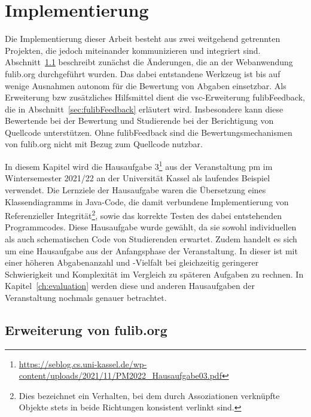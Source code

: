 \chapter{Implementierung}\label{ch:implementation}

Die Implementierung dieser Arbeit besteht aus zwei weitgehend getrennten Projekten, die jedoch miteinander kommunizieren und integriert sind.
Abschnitt~\ref{sec:expanding-fulib.org} beschreibt zunächst die Änderungen, die an der Webanwendung fulib.org durchgeführt wurden.
Das dabei entstandene Werkzeug ist bis auf wenige Ausnahmen autonom für die Bewertung von Abgaben einsetzbar.
Als Erweiterung \ac{bzw} zusätzliches Hilfsmittel dient die \ac{vsc}-Erweiterung fulibFeedback, die in Abschnitt~\ref{sec:fulibFeedback} erläutert wird.
Insbesondere kann diese Bewertende bei der Bewertung und Studierende bei der Berichtigung von Quellcode unterstützen.
Ohne fulibFeedback sind die Bewertungsmechanismen von fulib.org nicht mit Bezug zum Quellcode nutzbar.

In diesem Kapitel wird die Hausaufgabe 3\footnote{
    \url{https://seblog.cs.uni-kassel.de/wp-content/uploads/2021/11/PM2022_Hausaufgabe03.pdf}
} aus der Veranstaltung \ac{pm} im Wintersemester 2021/22 an der Universität Kassel als laufendes Beispiel verwendet.
Die Lernziele der Hausaufgabe waren die Übersetzung eines Klassendiagramms in Java-Code, die damit verbundene Implementierung von Referenzieller Integrität\footnote{
    Dies bezeichnet ein Verhalten, bei dem durch Assoziationen verknüpfte Objekte stets in beide Richtungen konsistent verlinkt sind.
}, sowie das korrekte Testen des dabei entstehenden Programmcodes.
Diese Hausaufgabe wurde gewählt, da sie sowohl individuellen als auch schematischen Code von Studierenden erwartet.
Zudem handelt es sich um eine Hausaufgabe aus der Anfangsphase der Veranstaltung.
In dieser ist mit einer höheren Abgabenanzahl und -Vielfalt bei gleichzeitig geringerer Schwierigkeit und Komplexität im Vergleich zu späteren Aufgaben zu rechnen.
In Kapitel~\ref{ch:evaluation} werden diese und anderen Hausaufgaben der Veranstaltung nochmals genauer betrachtet.

\section{Erweiterung von fulib.org}\label{sec:expanding-fulib.org}

